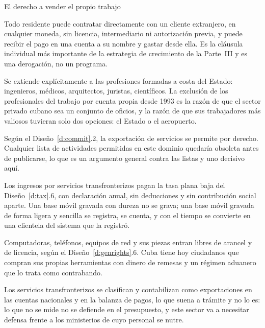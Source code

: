 \begin{design}{El derecho a vender el propio trabajo}
\label{d:contract}
\begin{rules}
 Todo residente puede contratar directamente con un cliente
extranjero, en cualquier moneda, sin licencia, intermediario ni autorización previa, y puede
recibir el pago en una cuenta a su nombre y gastar desde ella. Es la cláusula individual más
importante de la estrategia de crecimiento de la Parte~III y es una derogación, no un
programa.

 Se extiende explícitamente a las profesiones formadas a costa
del Estado: ingenieros, médicos, arquitectos, juristas, científicos. La exclusión de los
profesionales del trabajo por cuenta propia desde 1993 es la razón de que el sector privado
cubano sea un conjunto de oficios, y la razón de que sus trabajadores más valiosos tuvieran
solo dos opciones: el Estado o el aeropuerto.

 Según el Diseño~\ref{d:commit}.2, la exportación de
servicios se permite por derecho. Cualquier lista de actividades permitidas en este dominio
quedaría obsoleta antes de publicarse, lo que es un argumento general contra las listas y uno
decisivo aquí.

 Los ingresos por servicios
transfronterizos pagan la tasa plana baja del Diseño~\ref{d:tax}.6, con declaración anual,
sin deducciones y sin contribución social aparte. Una base móvil gravada con dureza no se
grava; una base móvil gravada de forma ligera y sencilla se registra, se cuenta, y con el
tiempo se convierte en una clientela del sistema que la registró.

 Computadoras, teléfonos, equipos de red y sus piezas entran libres de
arancel y de licencia, según el Diseño~\ref{d:genrights}.6. Cuba tiene hoy ciudadanos que
compran sus propias herramientas con dinero de remesas y un régimen aduanero que lo trata
como contrabando.

 Los servicios transfronterizos se clasifican y contabilizan como
exportaciones en las cuentas nacionales y en la balanza de pagos, lo que suena a trámite y no
lo es: lo que no se mide no se defiende en el presupuesto, y este sector va a necesitar
defensa frente a los ministerios de cuyo personal se nutre.
\end{rules}
\end{design}

